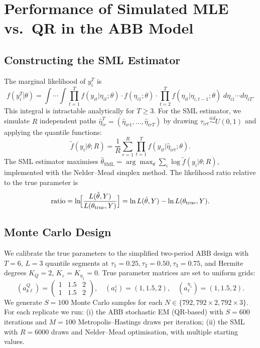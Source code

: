 \documentclass[12pt]{article}
\begin{document}
\section{Performance of Simulated MLE vs.\ QR in the ABB Model}
\label{sec:sml_abb}

\subsection{Constructing the SML Estimator}

The marginal likelihood of $y_i^T$ is
\begin{equation}\label{eq:lik}
f(y_i^T|\theta)=\int\cdots\int
\prod_{t=1}^T f(y_{it}|\eta_{it};\theta)\cdot
f(\eta_{i1};\theta)\cdot
\prod_{t=2}^T f(\eta_{it}|\eta_{i,t-1};\theta)\;
d\eta_{i1}\cdots d\eta_{iT}.
\end{equation}
This integral is intractable analytically for $T\ge3$.
For the SML estimator, we simulate $R$ independent paths
$\hat\eta_{ir}^T=(\hat\eta_{ir1},\ldots,\hat\eta_{irT})$ by drawing
$\tau_{irt}\stackrel{iid}{\sim}U(0,1)$ and applying the quantile functions:
\begin{equation}\label{eq:sml}
\tilde f(y_i|\theta;R)=\frac{1}{R}\sum_{r=1}^R
\prod_{t=1}^T f(y_{it}|\hat\eta_{irt};\theta).
\end{equation}
The SML estimator maximises
$\hat\theta_{\mathrm{SML}}=\arg\max_\theta\sum_i\log\tilde f(y_i|\theta;R)$,
implemented with the Nelder--Mead simplex method.
The likelihood ratio relative to the true parameter is
\begin{equation}\label{eq:ratio}
\text{ratio}=\ln\!\Bigl[\frac{L(\hat\theta,Y)}{L(\theta_{\text{true}},Y)}\Bigr]
=\ln L(\hat\theta,Y)-\ln L(\theta_{\text{true}},Y).
\end{equation}

\subsection{Monte Carlo Design}

We calibrate the true parameters to the simplified two-period ABB design with
$T=6$, $L=3$ quantile segments at $\tau_1=0.25, \tau_2=0.50, \tau_3=0.75$,
and Hermite degrees $K_Q=2$, $K_\varepsilon=K_{\eta_1}=0$.
True parameter matrices are set to uniform grids:
\begin{equation}
(a_{k\ell}^Q)=
\begin{pmatrix}1&1.5&2\\1&1.5&2\end{pmatrix},\quad
(a_\ell^\varepsilon)=(1,1.5,2),\quad
(a_\ell^{\eta_1})=(1,1.5,2).
\end{equation}
We generate $S=100$ Monte Carlo samples for each
$N\in\{792,792\times2,792\times3\}$.
For each replicate we run: (i) the ABB stochastic EM (QR-based) with $S=600$
iterations and $M=100$ Metropolis--Hastings draws per iteration; (ii) the SML
with $R=6000$ draws and Nelder--Mead optimisation, with multiple starting
values.
\end{document}
